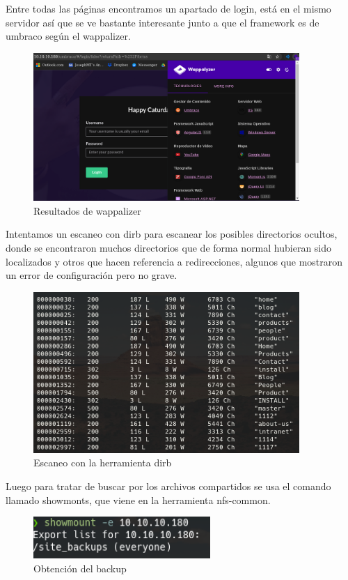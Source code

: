 \documentclass{article}
\begin{document}
Entre todas las páginas encontramos un apartado de login, está en el mismo servidor así que se ve bastante interesante junto a que el framework es de umbraco según el wappalizer.
\begin{figure}[h!]
	\center 
	\includegraphics[width=0.9\textwidth]{images/remote/wappalizer.png}
	\caption{Resultados de wappalizer}
\end{figure}

Intentamos un escaneo con dirb para escanear los posibles directorios ocultos, donde se encontraron muchos directorios que de forma normal hubieran sido localizados y otros que hacen referencia a redirecciones, algunos que mostraron un error de configuración pero no grave.
\begin{figure}[h!]
	\center 
	\includegraphics[width=0.9\textwidth]{images/remote/dirb.png}
	\caption{Escaneo con la herramienta dirb}
\end{figure}

\clearpage

Luego para tratar de buscar por los archivos compartidos se usa el comando llamado showmonts, que viene en la herramienta nfs-common.
\begin{figure}[h]
	\center 
	\includegraphics[width=0.6\textwidth]{images/remote/nfs.png}
	\caption{Obtención del backup}
\end{figure}
\end{document}
